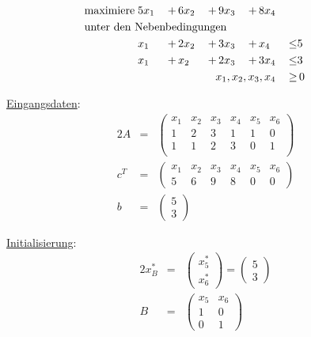 \documentclass[10pt,a4paper,oneside,ngerman,numbers=noenddot]{scrartcl}
\begin{document}
\section{} %
		\begin{alignat*}{5}
			\text{maximiere}\; & 5x_{1} \,&+&\, 6x_{2} \,&+&\, 9x_{3} \,&+&\, 8x_{4} && \\
			\multicolumn{10}{l}{\text{unter den Nebenbedingungen}} && \\
			\;& x_{1} \,&+&\, 2x_{2} \,&+&\, 3x_{3} \,&+&\, x_{4} \,&\leq & 5 \\
			\;& x_{1} \,&+&\, x_{2} \,&+&\, 2x_{3} \,&+&\, 3x_{4} \,&\leq & 3 \\		
			\multicolumn{8}{r}{$x_{1}, x_{2}, x_{3}, x_{4}$} \,&\geq &\, 0
		\end{alignat*}
		
		\underline{Eingangsdaten}:
		\begin{alignat*}{2}
			A &=& \begin{pmatrix}
				x_{1} & x_{2} & x_{3} & x_{4} & x_{5} & x_{6} \\
				1 & 2 & 3 & 1 & 1 & 0 \\
				1 & 1 & 2 & 3 & 0 & 1\\
			\end{pmatrix} \\
			c^{T} &=& \begin{pmatrix}
				x_{1} & x_{2} & x_{3} & x_{4} & x_{5} & x_{6} \\
				5 & 6 & 9 & 8 & 0 & 0
			\end{pmatrix} \\
			b &=& \begin{pmatrix}
				5 \\
				3
			\end{pmatrix}
		\end{alignat*}

		\underline{Initialisierung}:
		\begin{alignat*}{2}
			x_{B}^{*} &=& \begin{pmatrix}
				x_{5}^{*} \\
				x_{6}^{*}
			\end{pmatrix}
			=
			\begin{pmatrix}
				5 \\
				3
			\end{pmatrix} \\
			B &=& \begin{pmatrix}
				x_{5} & x_{6} \\
				1 & 0 \\
				0 & 1
			\end{pmatrix}
		\end{alignat*}
		
\end{document}
